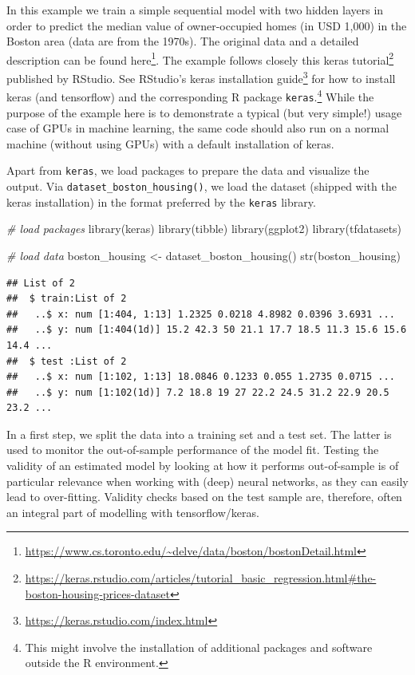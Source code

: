 \documentclass[
  12pt,
]{style/krantz}
\newenvironment{Shaded}{\begin{snugshade}}{\end{snugshade}}
\newcommand{\CommentTok}[1]{\textcolor[rgb]{0.56,0.35,0.01}{\textit{#1}}}
\newcommand{\FunctionTok}[1]{\textcolor[rgb]{0.00,0.00,0.00}{#1}}
\newcommand{\NormalTok}[1]{#1}
\newcommand{\OtherTok}[1]{\textcolor[rgb]{0.56,0.35,0.01}{#1}}
\renewcommand{\href}[2]{#2\footnote{\url{#1}}}
\begin{document}
In this example we train a simple sequential model with two hidden layers in order to predict the median value of owner-occupied homes (in USD 1,000) in the Boston area (data are from the 1970s). The original data and a detailed description can be found \href{https://www.cs.toronto.edu/~delve/data/boston/bostonDetail.html}{here}. The example follows closely \href{https://keras.rstudio.com/articles/tutorial_basic_regression.html\#the-boston-housing-prices-dataset}{this keras tutorial} published by RStudio. See \href{https://keras.rstudio.com/index.html}{RStudio's keras installation guide} for how to install keras (and tensorflow) and the corresponding R package \texttt{keras}.\footnote{This might involve the installation of additional packages and software outside the R environment.} While the purpose of the example here is to demonstrate a typical (but very simple!) usage case of GPUs in machine learning, the same code should also run on a normal machine (without using GPUs) with a default installation of keras.

Apart from \texttt{keras}, we load packages to prepare the data and visualize the output. Via \texttt{dataset\_boston\_housing()}, we load the dataset (shipped with the keras installation) in the format preferred by the \texttt{keras} library.

\begin{Shaded}
\begin{Highlighting}[]
\CommentTok{\# load packages}
\FunctionTok{library}\NormalTok{(keras)}
\FunctionTok{library}\NormalTok{(tibble)}
\FunctionTok{library}\NormalTok{(ggplot2)}
\FunctionTok{library}\NormalTok{(tfdatasets)}


\CommentTok{\# load data}
\NormalTok{boston\_housing }\OtherTok{\textless{}{-}} \FunctionTok{dataset\_boston\_housing}\NormalTok{()}
\FunctionTok{str}\NormalTok{(boston\_housing)}
\end{Highlighting}
\end{Shaded}

\begin{verbatim}
## List of 2
##  $ train:List of 2
##   ..$ x: num [1:404, 1:13] 1.2325 0.0218 4.8982 0.0396 3.6931 ...
##   ..$ y: num [1:404(1d)] 15.2 42.3 50 21.1 17.7 18.5 11.3 15.6 15.6 14.4 ...
##  $ test :List of 2
##   ..$ x: num [1:102, 1:13] 18.0846 0.1233 0.055 1.2735 0.0715 ...
##   ..$ y: num [1:102(1d)] 7.2 18.8 19 27 22.2 24.5 31.2 22.9 20.5 23.2 ...
\end{verbatim}

In a first step, we split the data into a training set and a test set. The latter is used to monitor the out-of-sample performance of the model fit. Testing the validity of an estimated model by looking at how it performs out-of-sample is of particular relevance when working with (deep) neural networks, as they can easily lead to over-fitting. Validity checks based on the test sample are, therefore, often an integral part of modelling with tensorflow/keras.
\end{document}
